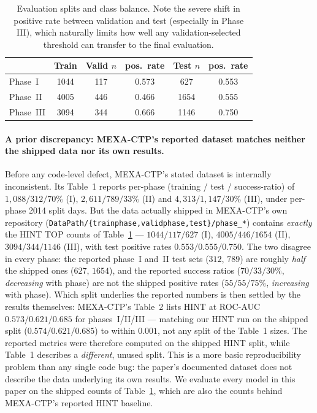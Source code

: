 \documentclass[a4paper,fleqn]{cas-sc}
\begin{document}
\begin{table}[t]
\centering
\small
\caption{Evaluation splits and class balance. Note the severe shift in positive rate between validation and test (especially in Phase III), which naturally limits how well any validation-selected threshold can transfer to the final evaluation.}
\label{tab:splits}
\begin{tabular}{lccccc}
\toprule
 & Train & Valid $n$ & pos.\ rate & Test $n$ & pos.\ rate \\
\midrule
Phase~I & 1044 & 117 & 0.573 & 627 & 0.553 \\
Phase~II & 4005  & 446 & 0.466 & 1654 & 0.555 \\
Phase~III & 3094 & 344 & 0.666 & 1146 & 0.750 \\
\bottomrule
\end{tabular}
\end{table}
\paragraph{A prior discrepancy: MEXA-CTP's reported dataset matches neither the shipped data nor
its own results.} Before any code-level defect, MEXA-CTP's stated dataset is internally
inconsistent. Its Table~1 reports per-phase (training / test / success-ratio) of
$1{,}088/312/70\%$ (I), $2{,}611/789/33\%$ (II) and $4{,}313/1{,}147/30\%$ (III), under
per-phase 2014 split days. But the data actually shipped in MEXA-CTP's own repository
(\texttt{DataPath/\{trainphase,validphase,test\}/phase\_*}) contains \emph{exactly} the HINT TOP
counts of Table~\ref{tab:splits} --- $1044/117/627$ (I), $4005/446/1654$ (II), $3094/344/1146$
(III), with test positive rates $0.553/0.555/0.750$. The two disagree in every phase: the
reported phase~I and~II test sets ($312$, $789$) are roughly \emph{half} the shipped ones
($627$, $1654$), and the reported success ratios ($70/33/30\%$, \emph{decreasing} with phase)
are not the shipped positive rates ($55/55/75\%$, \emph{increasing} with phase). Which split
underlies the reported numbers is then settled by the results themselves: MEXA-CTP's Table~2
lists HINT at ROC-AUC $0.573/0.621/0.685$ for phases~I/II/III --- matching our HINT run on the
shipped split ($0.574/0.621/0.685$) to within $0.001$, not any split of the Table~1 sizes. The
reported metrics were therefore computed on the shipped HINT split, while Table~1 describes a
\emph{different}, unused split. This is a more basic reproducibility problem than any single
code bug: the paper's documented dataset does not describe the data underlying its own results.
We evaluate every model in this paper on the shipped counts of Table~\ref{tab:splits}, which are
also the counts behind MEXA-CTP's reported HINT baseline.
\end{document}

